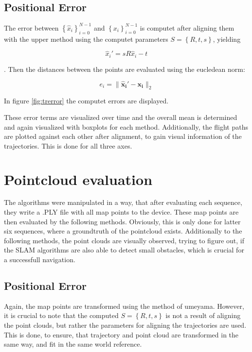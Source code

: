 	\subsection{Positional Error}
	
	The error between $\left\{{\widehat{x}_i}\right\}_{i=0}^{N-1}$ and $\left\{{x_i}\right\}_{i=0}^{N-1}$ is computet after aligning them 
	with the upper method using the computet parameters $S = \left\{R,t,s\right\}$, yielding
	
	$$ \widehat{x}_i' = sR\widehat{x}_i - t $$
	
	. Then the distances between the points are evaluated using the eucledean norm: 
	
	$$ e_i = \lVert \mathbf{\widehat{x}_i' - x_i} \rVert_2$$
	
	
	In figure \ref{fig:trerror} the computet errors are displayed. 
	
	
	These error terms are visualized over time and the overall mean is determined and again visualized with boxplots for each method.
	Additionally, the flight paths are plotted against each other after alignment, to gain visual information of the trajectories. 
	This is done for all three axes. 
	
\section{Pointcloud evaluation}

The algorithms were manipulated in a way, that after evaluating each sequence, they write a .PLY file with all map points to 
the device. These map points are then evaluated by the following methods. Obviously, this is only done for  latter six sequences, 
where a groundtruth of the pointcloud exists. Additionally to the following methods, the point clouds are visually observed, 
trying to figure out, if the SLAM algorithms are also able to detect small obstacles, which is crucial for a successfull navigation. 

	\subsection{Positional Error}
	
	Again, the map points are transformed using the method of umeyama. However, it is crucial to note that the computed 
	$S = \left\{R,t,s\right\}$ is not a result of aligning the point clouds, but rather the parameters for aligning the trajectories 
	are used. This is done, to ensure, that trajectory and point cloud are transformed in the same way, and fit in the same world reference. 
	
